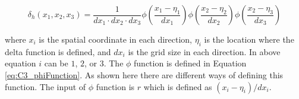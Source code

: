 \begin{equation}\label{eq:C3_regularizedDeltaFunction}
	\delta_h(x_1, x_2, x_3) = \frac{1}{dx_1 \cdot dx_2 \cdot dx_3}
							   \phi \left( \frac{x_1 - \eta_1}{dx_1} \right)
							   \phi \left( \frac{x_2 - \eta_2}{dx_2} \right)
							   \phi \left( \frac{x_2 - \eta_3}{dx_3} \right)
\end{equation}

where $x_i$ is the spatial coordinate in each direction, $\eta_i$ is the location where the delta function is defined, and $dx_i$ is the grid size in each direction. In above equation $i$ can be $1$, $2$, or $3$. The $\phi$ function is defined in Equation \eqref{eq:C3_phiFunction}. As shown here there are different ways of defining this function. The input of $\phi$ function is $r$ which is defined as $(x_i - \eta_i) / dx_i$.

